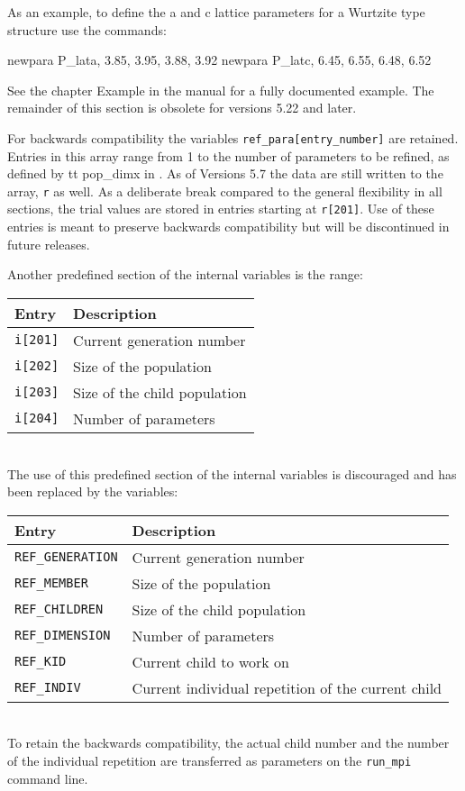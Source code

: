 As an example, to define the a and c lattice parameters for a 
Wurtzite type structure use the commands:
\begin{MacVerbatim}
newpara P_lata,  3.85, 3.95, 3.88, 3.92
newpara P_latc,  6.45, 6.55, 6.48, 6.52
\end{MacVerbatim}

See the chapter Example in the \Diffev manual for a fully documented
example. The remainder of this section is obsolete for versions 5.22 and 
later.

For backwards compatibility the variables {\tt ref\_para[entry\_number]}
are retained.
  Entries in this array
range from 1 to the number of parameters to be refined, as defined
by {tt pop\_dimx} in \diffev.
As of Versions 5.7 the data are still written to the array, {\tt r} as 
well. As a deliberate break compared
to the general flexibility in all \Suite sections, the trial values are 
stored in entries starting at {\tt r[201]}. Use of these entries is meant 
to preserve backwards compatibility but will be discontinued in 
future releases.

Another predefined section of the internal variables is the range:\\
\begin{tabularx}{\textwidth}{|p{30mm}|X|}
  \hline
  {\bf Entry } & {\bf Description} \\
  \hline
  {\tt i[201]} & Current generation number \\
  \hline
  {\tt i[202]} & Size of the population \\
  \hline
  {\tt i[203]} & Size of the child population \\
  \hline
  {\tt i[204]} & Number of parameters \\
  \hline
\end{tabularx}
{ } \\
The use of this predefined  section of the internal variables 
is discouraged and has been replaced by the variables:\\
\begin{tabularx}{\textwidth}{|p{35mm}|X|}
  \hline
  {\bf Entry } & {\bf Description} \\
  \hline
  {\tt REF\_GENERATION} & Current generation number \\
  \hline
  {\tt REF\_MEMBER} & Size of the population \\
  \hline
  {\tt REF\_CHILDREN} & Size of the child population \\
  \hline
  {\tt REF\_DIMENSION} & Number of parameters \\
  \hline
  {\tt REF\_KID} & Current child to work on \\
  \hline
  {\tt REF\_INDIV} & Current individual repetition of the current child \\
  \hline
\end{tabularx}
{ } \\
To retain the backwards compatibility, the actual child number and the number 
of the individual repetition are transferred as parameters on 
the {\tt run\_mpi} command line.

